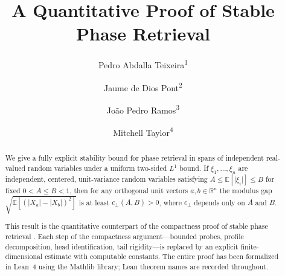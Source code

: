 \documentclass[11pt]{amsart}
\title{A Quantitative Proof of Stable Phase Retrieval}
\author{Pedro Abdalla Teixeira\textsuperscript{1}}
\author{Jaume de Dios Pont\textsuperscript{2}}
\author{Jo\~ao Pedro Ramos\textsuperscript{3}}
\author{Mitchell Taylor\textsuperscript{4}}
\theoremstyle{definition}
\theoremstyle{remark}
\newcommand{\E}{\mathbb{E}}
\newcommand{\R}{\mathbb{R}}
\newcommand{\abs}[1]{\lvert #1 \rvert}
\begin{document}
\begin{abstract}
We give a fully explicit stability bound for phase retrieval in spans of
independent real-valued random variables under a uniform two-sided $L^1$
bound. If $\xi_1,\dots,\xi_n$ are independent, centered, unit-variance random
variables satisfying $A \le \E[\abs{\xi_i}] \le B$ for fixed $0 < A \le B < 1$,
then for any orthogonal unit vectors $a,b \in \R^n$ the modulus gap
$\sqrt{\E[(\abs{X_a}-\abs{X_b})^2]}$ is at least $c_\perp(A,B) > 0$, where
$c_\perp$ depends only on $A$ and $B$.

This result is the quantitative counterpart of the compactness proof of
stable phase retrieval \cite{compactness}. Each step of the compactness
argument---bounded probes, profile decomposition, head identification,
tail rigidity---is replaced by an explicit finite-dimensional estimate
with computable constants. The entire proof has been formalized in Lean~4
using the Mathlib library; Lean theorem names are recorded throughout.
\end{abstract}
\maketitle
\begingroup
\renewcommand{\thefootnote}{\arabic{footnote}}
\endgroup







\appendix

\end{document}

